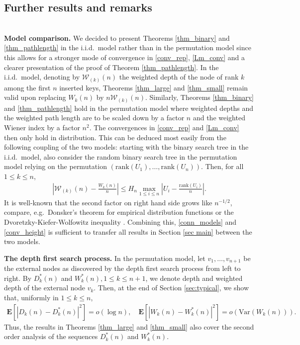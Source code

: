 \documentclass{amsart}       %
\newcommand{\E}[1]{\ensuremath{\mathbf{E} \left[#1 \right]}}
\begin{document}
\subsection{Further results and remarks} \label{sec13} \hfill\\

 \textbf{Model comparison.}   We decided to present Theorems \ref{thm_binary} and  \ref{thm_pathlength} in the i.i.d.\ model rather than in the permutation model since this allows for a stronger mode of convergence in 
\eqref{conv_rep}, \eqref{Lm_conv} and a clearer presentation of the proof of Theorem \ref{thm_pathlength}. 
In the i.i.d.\ model, denoting by $\mathcal{W}_{(k)}(n)$ the weighted depth of the node of rank $k$ among the first $n$ inserted keys, Theorems \ref{thm_large} and \ref{thm_small} remain valid upon replacing $W_k(n)$ by $n \mathcal{W}_{(k)}(n)$. 
Similarly, Theorems \ref{thm_binary} and \ref{thm_pathlength} hold in the permutation model where weighted depths and the weighted path length are to be scaled down by a factor $n$ and the weighted Wiener index by a factor $n^2$. 
The convergences in \eqref{conv_rep} and \eqref{Lm_conv} then only hold in distribution.
This can be deduced most easily from the following coupling of the two models: starting with the binary search tree in the i.i.d.\ model, also consider the random binary search tree in the permutation model relying on the permutation $(\text{rank}(U_1), \ldots, \text{rank}(U_n))$. Then, for all $1 \leq k \leq n$,
\begin{align} \left | \mathcal{W}_{(k)}(n) - \frac{W_k(n)}{n} \right| \leq H_n \max_{1 \leq i \leq n} \left| U_i - \frac{\text{rank}(U_i)}{n} \right|. \label{conn_models} \end{align}
It is well-known that the second factor on right hand side grows like $n^{-1/2}$, compare, e.g.\ Donsker's theorem for empirical distribution functions or the Dvoretzky-Kiefer-Wolfowitz inequality \cite{dvkiwo}. Combining this, \eqref{conn_models} and \eqref{conv_height} is sufficient to transfer all results in Section \ref{sec main} between the two models.


\medskip \textbf{The depth first search process.}
In the permutation model, let $v_1, \ldots, v_{n+1}$ be the external nodes as discovered by the depth first search process from left to right. By $D^*_k(n)$ and $W^*_k(n), 1 \leq k \leq n+1$, we denote depth and weighted depth of the external node $v_k$. Then, at the end of Section \ref{sec:typical}, we show that, uniformly in $1 \leq k \leq n$,
\begin{align} \label{Dbound}
\E{|D_k(n) - D^*_k(n)|^2} = o(\log n), \quad \E{|W_k(n) - W^*_k(n)|^2} = o(\text{Var}(W_k(n))).\end{align}
Thus, the results in Theorems \ref{thm_large} and \ref{thm_small} also cover the second order analysis of the sequences $D_k^*(n)$ and $W_k^*(n)$.
\end{document}

